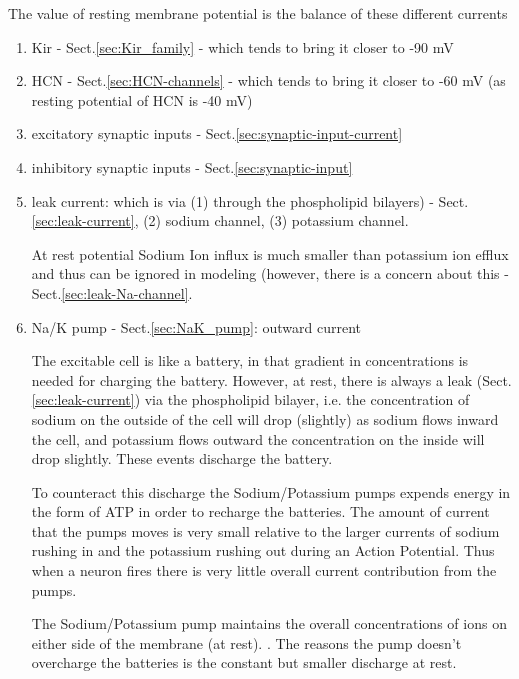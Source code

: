 The value of resting membrane potential is the balance of these different
currents
\begin{enumerate}
  \item Kir - Sect.\ref{sec:Kir_family} - which tends to bring it closer to -90
  mV
  
  \item HCN - Sect.\ref{sec:HCN-channels} - which tends to bring it closer to
  -60 mV (as resting potential of HCN is -40 mV)
  
  \item excitatory synaptic inputs - Sect.\ref{sec:synaptic-input-current}
  
  \item inhibitory synaptic inputs - Sect.\ref{sec:synaptic-input}
  
  \item leak current: which is via (1) through the phospholipid bilayers) -
  Sect.\ref{sec:leak-current}, (2) sodium channel, (3) potassium channel.
  
  At rest potential Sodium Ion influx is much smaller than potassium ion efflux
  and thus can be ignored in modeling (however, there is a concern about this -
  Sect.\ref{sec:leak-Na-channel}.
  
  
  \item Na/K pump - Sect.\ref{sec:NaK_pump}: outward current 

  The excitable cell is like a battery, in that gradient in concentrations is
  needed for charging the battery. However, at rest, there is always a leak
  (Sect.\ref{sec:leak-current}) via the phospholipid bilayer, i.e. the
concentration of sodium on the outside of the cell will drop (slightly) as
sodium flows inward the cell, and potassium flows outward the concentration on
the inside will drop slightly. These events discharge the battery.

To counteract this discharge the Sodium/Potassium pumps expends energy in the
form of ATP in order to recharge the batteries. The amount of current that the
pumps moves is very small relative to the larger currents of sodium rushing in
and the potassium rushing out during an Action Potential. Thus when a neuron
fires there is very little overall current contribution from the pumps.
  
  The Sodium/Potassium pump maintains the overall concentrations of ions on
  either side of the membrane (at rest). . The reasons the pump doesn't
  overcharge the batteries is the constant but smaller discharge at rest. 
  

\end{enumerate}
